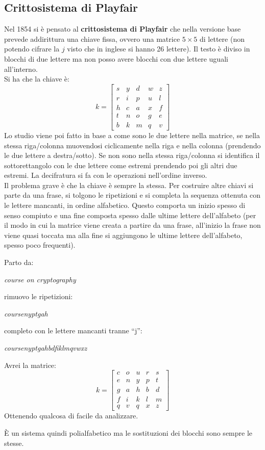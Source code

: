 \documentclass[a4paper,12pt, oneside]{book}
\begin{document}
\subsection{Crittosistema di Playfair}
Nel 1854 si è pensato al \textbf{crittosistema di Playfair} che nella versione
base prevede addirittura una chiave fissa, ovvero una matrice $5\times 5$ di
lettere (non potendo cifrare la $j$ visto che in inglese si hanno 26
lettere). Il testo è diviso in blocchi di due lettere ma non posso avere blocchi
con due lettere uguali all'interno.\\
Si ha che la chiave è:
\[k=\left[
    \begin{matrix}
      s & y & d & w & z\\
      r & i & p & u & l\\
      h & c & a & x & f\\
      t & n & o & g & e\\
      b & k & m & q & v
    \end{matrix}
  \right]\]
Lo studio viene poi fatto in base a come sono le due lettere nella matrice, se
nella stessa riga/colonna muovendosi ciclicamente nella riga e nella colonna
(prendendo le due lettere a destra/sotto). Se
non sono nella stessa riga/colonna si identifica 
il sottorettangolo con le due lettere come estremi prendendo poi gli altri due
estremi. La decifratura si fa con le operazioni nell'ordine inverso.\\
Il problema grave è che la chiave è sempre la stessa. Per costruire altre chiavi
si parte da una frase, si tolgono le ripetizioni e si completa la sequenza
ottenuta con le lettere mancanti, in ordine alfabetico. Questo comporta un
inizio spesso di senso compiuto e una fine composta spesso dalle ultime lettere
dell'alfabeto (per il modo in cui la matrice viene creata a partire da una
frase, all'inizio la frase non viene quasi toccata ma alla fine si aggiungono
le ultime lettere dell'alfabeto, spesso poco frequenti).\\
\begin{esempio}
  Parto da:
  \begin{center}
    \textit{course on cryptography}
  \end{center}
  rimuovo le ripetizioni:
  \begin{center}
    \textit{coursenyptgah}
  \end{center}
  completo con le lettere mancanti tranne ``j'':
  \begin{center}
    \textit{coursenyptgahbdfiklmqvwxz}
  \end{center}
  Avrei la matrice:
  \[k=\left[
    \begin{matrix}
      c & o & u & r & s\\
      e & n & y & p & t\\
      g & a & h & b & d\\
      f & i & k & l & m\\
      q & v & q & x & z
    \end{matrix}
  \right]
\]
Ottenendo qualcosa di facile da analizzare.
\end{esempio}
È un sistema quindi polialfabetico ma le sostituzioni dei blocchi sono sempre le
stesse.
\end{document}
